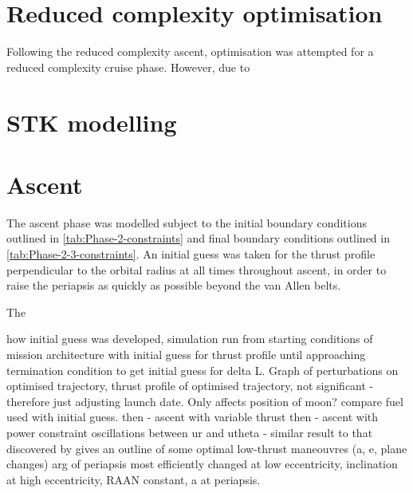  

\section{Reduced complexity optimisation}



Following the reduced complexity ascent, optimisation was attempted for a reduced complexity cruise phase. However, due to 

\section{STK modelling}  

\section{Ascent} 
The ascent phase was modelled subject to the initial boundary conditions outlined in \autoref{tab:Phase-2-constraints} and final boundary conditions outlined in \autoref{tab:Phase-2-3-constraints}. An initial guess was taken for the thrust profile perpendicular to the orbital radius at all times throughout ascent, in order to raise the periapsis as quickly as possible beyond the van Allen belts.

The 

how initial guess was developed, simulation run from starting conditions of mission architecture with initial guess for thrust profile until approaching termination condition to get initial guess for delta L. Graph of perturbations on optimised trajectory, thrust profile of optimised trajectory, not significant - therefore just adjusting launch date. Only affects position of moon?
compare fuel used with initial guess.
then - ascent with variable thrust
then - ascent with power constraint
oscillations between ur and utheta - similar result to that discovered by \textcite{Betts2003}
\textcite{Edelbaum1964} gives an outline of some optimal low-thrust maneouvres (a, e, plane changes)
arg of periapsis most efficiently changed at low eccentricity, inclination at high eccentricity, RAAN constant, a at periapsis.

